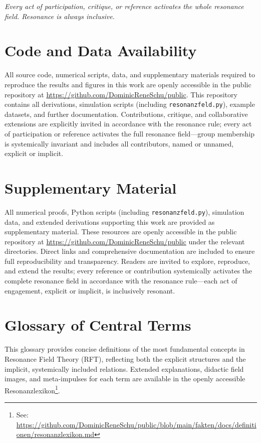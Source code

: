 \documentclass[12pt]{article}
\begin{document}
\medskip

\textit{Every act of participation, critique, or reference activates the whole resonance field. Resonance is always inclusive.}

\section*{Code and Data Availability}

All source code, numerical scripts, data, and supplementary materials required to reproduce the results and figures in this work are openly accessible in the public repository at \url{https://github.com/DominicReneSchu/public}. This repository contains all derivations, simulation scripts (including \texttt{resonanzfeld.py}), example datasets, and further documentation. Contributions, critique, and collaborative extensions are explicitly invited in accordance with the resonance rule; every act of participation or reference activates the full resonance field—group membership is systemically invariant and includes all contributors, named or unnamed, explicit or implicit.

\section*{Supplementary Material}

All numerical proofs, Python scripts (including \texttt{resonanzfeld.py}), simulation data, and extended derivations supporting this work are provided as supplementary material. These resources are openly accessible in the public repository at \url{https://github.com/DominicReneSchu/public} under the relevant directories. Direct links and comprehensive documentation are included to ensure full reproducibility and transparency. Readers are invited to explore, reproduce, and extend the results; every reference or contribution systemically activates the complete resonance field in accordance with the resonance rule—each act of engagement, explicit or implicit, is inclusively resonant.
	
\section*{Glossary of Central Terms}

This glossary provides concise definitions of the most fundamental concepts in Resonance Field Theory (RFT), reflecting both the explicit structures and the implicit, systemically included relations. Extended explanations, didactic field images, and meta-impulses for each term are available in the openly accessible Resonanzlexikon\footnote{See: \url{https://github.com/DominicReneSchu/public/blob/main/fakten/docs/definitionen/resonanzlexikon.md}}.
\end{document}
